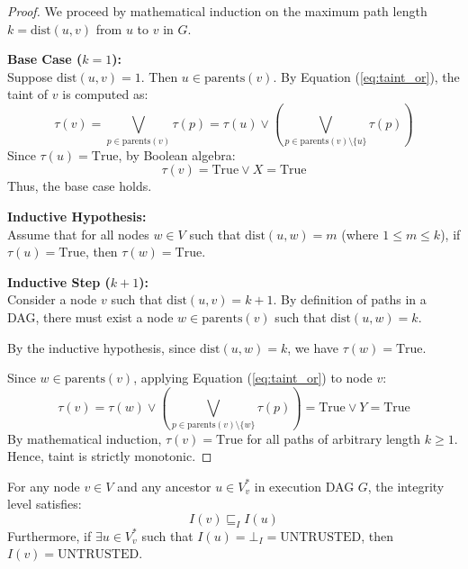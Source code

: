 \begin{proof}
We proceed by mathematical induction on the maximum path length $k = \text{dist}(u, v)$ from $u$ to $v$ in $G$.

\textbf{Base Case ($k = 1$):} \\
Suppose $\text{dist}(u, v) = 1$. Then $u \in \text{parents}(v)$. By Equation (\ref{eq:taint_or}), the taint of $v$ is computed as:
\begin{equation}
\tau(v) = \bigvee_{p \in \text{parents}(v)} \tau(p) = \tau(u) \lor \left(\bigvee_{p \in \text{parents}(v) \setminus \{u\}} \tau(p)\right)
\end{equation}
Since $\tau(u) = \text{True}$, by Boolean algebra:
\begin{equation}
\tau(v) = \text{True} \lor X = \text{True}
\end{equation}
Thus, the base case holds.

\textbf{Inductive Hypothesis:} \\
Assume that for all nodes $w \in V$ such that $\text{dist}(u, w) = m$ (where $1 \le m \le k$), if $\tau(u) = \text{True}$, then $\tau(w) = \text{True}$.

\textbf{Inductive Step ($k + 1$):} \\
Consider a node $v$ such that $\text{dist}(u, v) = k + 1$. By definition of paths in a DAG, there must exist a node $w \in \text{parents}(v)$ such that $\text{dist}(u, w) = k$. 

By the inductive hypothesis, since $\text{dist}(u, w) = k$, we have $\tau(w) = \text{True}$. 

Since $w \in \text{parents}(v)$, applying Equation (\ref{eq:taint_or}) to node $v$:
\begin{equation}
\tau(v) = \tau(w) \lor \left(\bigvee_{p \in \text{parents}(v) \setminus \{w\}} \tau(p)\right) = \text{True} \lor Y = \text{True}
\end{equation}
By mathematical induction, $\tau(v) = \text{True}$ for all paths of arbitrary length $k \ge 1$. Hence, taint is strictly monotonic.
\end{proof}

\begin{lemma}
\label{lem:integ_anti}
For any node $v \in V$ and any ancestor $u \in V_v^*$ in execution DAG $G$, the integrity level satisfies:
\begin{equation}
I(v) \sqsubseteq_I I(u)
\end{equation}
Furthermore, if $\exists u \in V_v^*$ such that $I(u) = \bot_I = \text{UNTRUSTED}$, then $I(v) = \text{UNTRUSTED}$.
\end{lemma}

